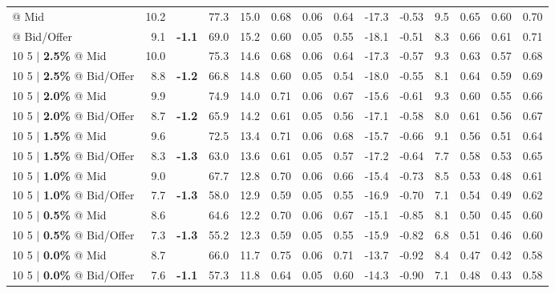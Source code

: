 \documentclass{beamer}
\begin{document}
\begin{frame}
\begin{table}
{\begin{tabular}{lrcrrrrrrrrrrr}
\midrule

\addlinespace
\color{blue}{10 5 $|$ \bf 3.0\%} @ Mid & 10.2 & & 77.3 & 15.0 & 0.68 & 0.06 & 0.64 & -17.3 & -0.53 & 9.5 & 0.65 & 0.60 & 0.70\\
\color{blue}{10 5 $|$ \bf 3.0\%} @ Bid/Offer & 9.1 & {\bf \color{red}-1.1} & 69.0 & 15.2 & 0.60 & 0.05 & 0.55 & -18.1 & -0.51 & 8.3 & 0.66 & 0.61 & 0.71\\
\addlinespace
{10 5 $|$ \bf 2.5\%} @ Mid & 10.0 & & 75.3 & 14.6 & 0.68 & 0.06 & 0.64 & -17.3 & -0.57 & 9.3 & 0.63 & 0.57 & 0.68\\
{10 5 $|$ \bf 2.5\%} @ Bid/Offer & 8.8 & {\bf \color{red}-1.2} & 66.8 & 14.8 & 0.60 & 0.05 & 0.54 & -18.0 & -0.55 & 8.1 & 0.64 & 0.59 & 0.69\\
\addlinespace
{10 5 $|$ \bf 2.0\%} @ Mid & 9.9 & & 74.9 & 14.0 & 0.71 & 0.06 & 0.67 & -15.6 & -0.61 & 9.3 & 0.60 & 0.55 & 0.66\\
{10 5 $|$ \bf 2.0\%} @ Bid/Offer & 8.7 & {\bf \color{red}-1.2} & 65.9 & 14.2 & 0.61 & 0.05 & 0.56 & -17.1 & -0.58 & 8.0 & 0.61 & 0.56 & 0.67\\
\addlinespace
{10 5 $|$ \bf 1.5\%} @ Mid & 9.6 & & 72.5 & 13.4 & 0.71 & 0.06 & 0.68 & -15.7 & -0.66 & 9.1 & 0.56 & 0.51 & 0.64\\
{10 5 $|$ \bf 1.5\%} @ Bid/Offer & 8.3 & {\bf \color{red}-1.3} & 63.0 & 13.6 & 0.61 & 0.05 & 0.57 & -17.2 & -0.64 & 7.7 & 0.58 & 0.53 & 0.65\\
\addlinespace
{10 5 $|$ \bf 1.0\%} @ Mid & 9.0 & & 67.7 & 12.8 & 0.70 & 0.06 & 0.66 & -15.4 & -0.73 & 8.5 & 0.53 & 0.48 & 0.61\\
{10 5 $|$ \bf 1.0\%} @ Bid/Offer & 7.7 & {\bf \color{red}-1.3} & 58.0 & 12.9 & 0.59 & 0.05 & 0.55 & -16.9 & -0.70 & 7.1 & 0.54 & 0.49 & 0.62\\
\addlinespace
{10 5 $|$ \bf 0.5\%} @ Mid & 8.6 & & 64.6 & 12.2 & 0.70 & 0.06 & 0.67 & -15.1 & -0.85 & 8.1 & 0.50 & 0.45 & 0.60\\
{10 5 $|$ \bf 0.5\%} @ Bid/Offer & 7.3 & {\bf \color{red}-1.3} & 55.2 & 12.3 & 0.59 & 0.05 & 0.55 & -15.9 & -0.82 & 6.8 & 0.51 & 0.46 & 0.60\\
\addlinespace
{10 5 $|$ \bf 0.0\%} @ Mid & 8.7 & & 66.0 & 11.7 & 0.75 & 0.06 & 0.71 & -13.7 & -0.92 & 8.4 & 0.47 & 0.42 & 0.58\\
{10 5 $|$ \bf 0.0\%} @ Bid/Offer & 7.6 & {\bf \color{red}-1.1} & 57.3 & 11.8 & 0.64 & 0.05 & 0.60 & -14.3 & -0.90 & 7.1 & 0.48 & 0.43 & 0.58\\
\bottomrule
\end{tabular}
}
\end{table}
\end{frame}
\end{document}
